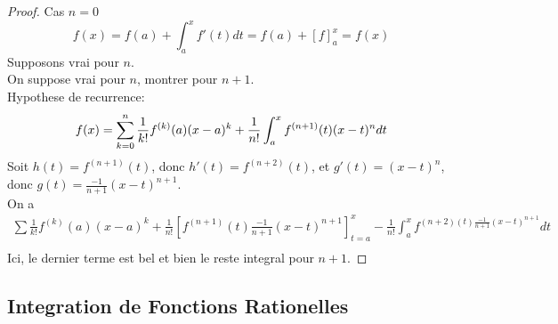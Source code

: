 \documentclass[../main.tex]{subfiles}
\begin{document}
\begin{proof}
Cas $n=0$
\[ 
	f( x) = f( a) + \int_{ a }^{ x }f'( t) dt = f( a) + [ f] _{a} ^{x} = f( x) 
\]
Supposons vrai pour $n$.\\
On suppose vrai pour $n$, montrer pour $n+1$.\\
Hypothese de recurrence:
\[ 
	f( x) = \sum_{k=0}^{ n}\frac{1}{k!}f^{(k ) }( a) ( x-a)^{k} + \frac{1}{n!}\int_{ a }^{ x }f^{( n+1) }( t) ( x-t)^{n}dt\\
\]
Soit $h( t) = f^{( n+1) }( t) $, donc $h'( t) = f^{( n+2) }( t) $, et $g'( t) = ( x-t) ^{n}$, donc $g( t) = \frac{-1}{n+1}( x-t) ^{n+1}$.\\
On a
\begin{align*}
	\sum \frac{1}{k!} f^{( k) }( a) ( x-a) ^{k} + \frac{1}{n!} \left[ f^{( n+1) }( t) \frac{-1}{n+1}( x-t)^{n+1}\right]_{t=a}^{x} - \frac{1}{n!}\int_{ a }^{ x } f^{( n+2) ( t) \frac{-1}{n+1}( x-t)^{n+1}}dt\\
\end{align*}
Ici, le dernier terme est bel et bien le reste integral pour $n+1$.



\end{proof}
\subsection{Integration de Fonctions Rationelles}
\end{document}
